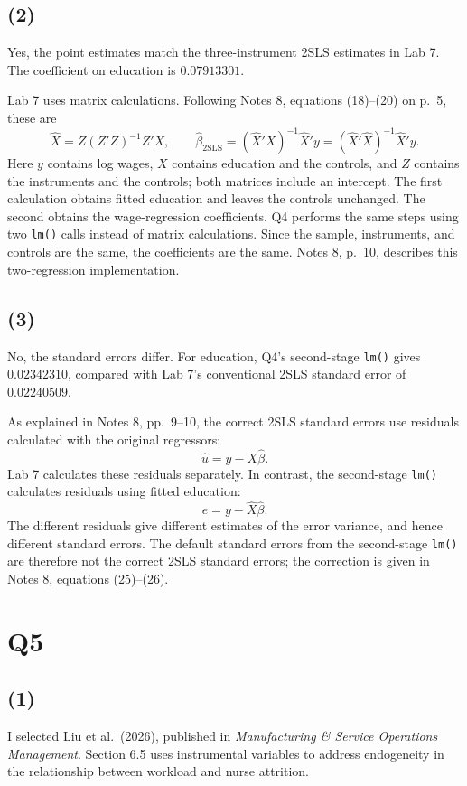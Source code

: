\documentclass[11pt]{article}
\newcommand{\code}[1]{\texttt{#1}}
\begin{document}
\subsection{(2)}
Yes, the point estimates match the three-instrument 2SLS estimates in
Lab 7. The coefficient on education is $0.07913301$.

Lab 7 uses matrix calculations. Following Notes 8, equations (18)--(20)
on p.\ 5, these are
\[
 \widehat X=Z(Z'Z)^{-1}Z'X,\qquad
 \widehat\beta_{\mathrm{2SLS}}
   =(\widehat X'X)^{-1}\widehat X'y
   =(\widehat X'\widehat X)^{-1}\widehat X'y.
\]
Here $y$ contains log wages, $X$ contains education and the controls,
and $Z$ contains the instruments and the controls; both matrices include
an intercept. The first calculation obtains fitted education and leaves
the controls unchanged. The second obtains the wage-regression coefficients.
Q4 performs the same steps using two \code{lm()} calls instead of matrix
calculations. Since the sample, instruments, and controls are the same,
the coefficients are the same. Notes 8, p.\ 10, describes this two-regression
implementation.

\subsection{(3)}
No, the standard errors differ. For education, Q4's second-stage
\code{lm()} gives $0.02342310$, compared with Lab 7's conventional 2SLS
standard error of $0.02240509$.

As explained in Notes 8, pp.\ 9--10, the correct 2SLS standard errors
use residuals calculated with the original regressors:
\[
 \widehat u=y-X\widehat\beta.
\]
Lab 7 calculates these residuals separately. In contrast, the second-stage
\code{lm()} calculates residuals using fitted education:
\[
 e=y-\widehat X\widehat\beta.
\]
The different residuals give different estimates of the error variance,
and hence different standard errors. The default standard errors from
the second-stage \code{lm()} are therefore not the correct 2SLS standard
errors; the correction is given in Notes 8, equations (25)--(26).

\clearpage
\section{Q5}
\label{sec:q5}
\subsection{(1)}
I selected Liu et al.\ (2026), published in
\emph{Manufacturing \& Service Operations Management}.
Section 6.5 uses instrumental variables to address endogeneity in the
relationship between workload and nurse attrition.
\end{document}
